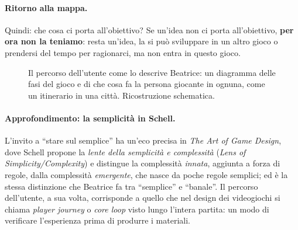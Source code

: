 \paragraph{Ritorno alla mappa.} Quindi: che cosa ci porta all'obiettivo? Se un'idea
non ci porta all'obiettivo, \textbf{per ora non la teniamo}: resta un'idea, la si può
sviluppare in un altro gioco o prendersi del tempo per ragionarci, ma non entra in
questo gioco.

\begin{figure}[htbp]
\centering
{}
\caption{Il percorso dell'utente come lo descrive Beatrice: un diagramma delle fasi
del gioco e di che cosa fa la persona giocante in ognuna, come un itinerario in una
città. Ricostruzione schematica.}
\label{a7:fig:percorso}
\end{figure}

\paragraph{Approfondimento: la semplicità in Schell.} L'invito a ``stare sul semplice''
ha un'eco precisa in \emph{The Art of Game Design}, dove Schell propone la
\emph{lente della semplicità e complessità} (\emph{Lens of Simplicity/Complexity}) e
distingue la complessità \emph{innata}, aggiunta a forza di regole, dalla complessità
\emph{emergente}, che nasce da poche regole semplici; ed è la stessa distinzione che
Beatrice fa tra ``semplice'' e ``banale''. Il percorso dell'utente, a sua volta,
corrisponde a quello che nel design dei videogiochi si chiama \emph{player journey} o
\emph{core loop} visto lungo l'intera partita: un modo di verificare l'esperienza
prima di produrre i materiali.

